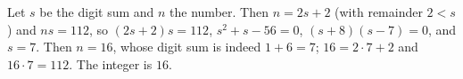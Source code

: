 Let $s$ be the digit sum and $n$ the number. Then $n=2s+2$ (with remainder $2<s$) and $ns=112$, so $(2s+2)s=112$, $s^2+s-56=0$, $(s+8)(s-7)=0$, and $s=7$. Then $n=16$, whose digit sum is indeed $1+6=7$; $16=2\cdot7+2$ and $16\cdot7=112$. The integer is $\boxed{16}$.
